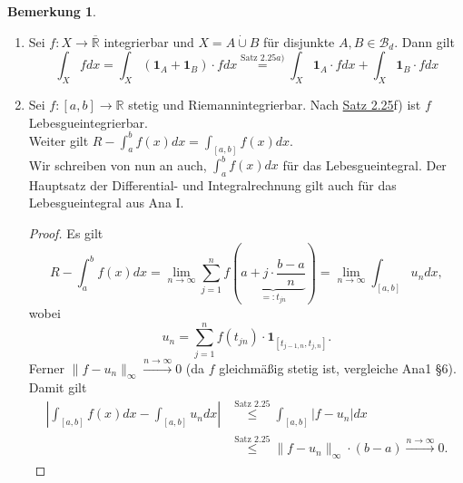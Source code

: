 \documentclass[a4paper]{scrreprt}
\newcommand{\doubleOne}{\textbf{1}}
\newcommand{\R}{\mathbb{R}}
\newcommand{\Rq}{\overline{\R}}
\newcommand{\Borel}{\mathcal{B}}
\newcommand{\toInf}{\rightarrow \infty}
\newcommand{\limToInf}[1]{\lim_{#1 \toInf}}
\newcommand{\Bd}{\Borel_d}
\newcommand{\dcup}{\dot{\cup}}
\newcommand{\jlabel}[1]{\label{j_#1}}
\newcommand{\jshortlink}[1]{\jhyperref{#1}{\text{#1}}}
\newcommand{\jhyperref}[2]{\hyperref[j_#1]{#2}}
\newcommand{\jlink}[1]{\jhyperref{#1}{#1}}
\newcommand{\jabb}[3]{ #1: #2 \rightarrow #3 }
\theoremstyle{plain}
\theoremstyle{definition}
\newtheorem{bem}[thm]{Bemerkung}
\begin{document}
{{{{\jlabel{Bem 2.26}
\begin{bem}
    \begin{enumerate}
        \item
            Sei $\jabb{f}{X}{\Rq}$ integrierbar und $X=A\dcup B$ für disjunkte $A,B\in \Bd$. Dann gilt
            \begin{displaymath}
                \int_X f dx = \int_X (\doubleOne_A + \doubleOne_B) \cdot f dx \overset{\jshortlink{Satz 2.25}a)}{=} \int_X \doubleOne_A \cdot f dx + \int_X \doubleOne_B \cdot f dx
            \end{displaymath}
        \item
            Sei $\jabb{f}{[a,b]}{\R}$ stetig und Riemannintegrierbar. Nach \jlink{Satz 2.25}f) ist $f$ Lebesgueintegrierbar.\\
            Weiter gilt $R-\int_a^b f(x)dx = \int_{[a,b]} f(x) dx$.\\
            Wir schreiben von nun an auch, $\int_a^bf(x)dx$ für das Lebesgueintegral. Der Hauptsatz der Differential- und Integralrechnung gilt auch für das Lebesgueintegral aus Ana I.
            \begin{proof}
                Es gilt 
                \begin{displaymath}
                    R-\int_a^b f(x) dx = \limToInf{n} \sum_{j=1}^n f(\underbrace{a + j\cdot \frac{b-a}{n}}_{=: t_{jn}}) = \limToInf{n} \int_{[a,b]} u_n dx,
                \end{displaymath}
                wobei
                \begin{displaymath}
                    u_n = \sum_{j=1}^n f(t_{jn})\cdot \doubleOne_{[t_{j-1,n},t_{j,n}]}.
                \end{displaymath}
                Ferner $\lVert f- u_n \rVert_\infty \xrightarrow{n\rightarrow \infty}0$ (da $f$ gleichmäßig stetig ist, vergleiche Ana1 §6). Damit gilt
                \begin{displaymath}
                    \begin{split}
                        |\int_{[a,b]} f(x)dx - \int_{[a,b]} u_n dx| &\overset{\jshortlink{Satz 2.25}}{\le} \int_{[a,b]} |f-u_n|dx \\
                        &\overset{\jshortlink{Satz 2.25}}{\le} \lVert f-u_n\rVert_\infty \cdot (b-a) \xrightarrow{n\rightarrow \infty} 0.
                    \end{split}
                \end{displaymath}
            \end{proof}

\end{enumerate}
\end{bem}}}}}
\end{document}
